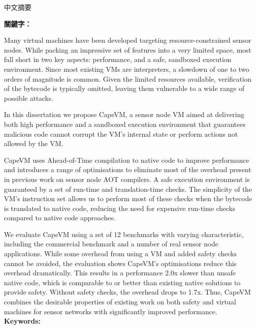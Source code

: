 \begin{abstractzh}
中文摘要

\bigbreak
\noindent \textbf{關鍵字：}{\, \makeatletter \@keywordszh \makeatother}
\end{abstractzh}

\begin{abstracten}
Many virtual machines have been developed targeting resource-constrained sensor nodes. While packing an impressive set of features into a very limited space, most fall short in two key aspects: performance, and a safe, sandboxed execution environment. Since most existing VMs are interpreters, a slowdown of one to two orders of magnitude is common. Given the limited resources available, verification of the bytecode is typically omitted, leaving them vulnerable to a wide range of possible attacks.

In this dissertation we propose CapeVM, a sensor node VM aimed at delivering both high performance and a sandboxed execution environment that guarantees malicious code cannot corrupt the VM's internal state or perform actions not allowed by the VM.

CapeVM uses Ahead-of-Time compilation to native code to improve performance and introduces a range of optimisations to eliminate most of the overhead present in previous work on sensor node AOT compilers. A safe execution environment is guaranteed by a set of run-time and translation-time checks. The simplicity of the VM's instruction set allows us to perform most of these checks when the bytecode is translated to native code, reducing the need for expensive run-time checks compared to native code approaches.

We evaluate CapeVM using a set of 12 benchmarks with varying characteristic, including the commercial  benchmark and a number of real sensor node applications. While some overhead from using a VM and added safety checks cannot be avoided, the evaluation shows CapeVM's optimisations reduce this overhead dramatically. This results in a performance 2.0x slower than unsafe native code, which is comparable to or better than existing native solutions to provide safety. Without safety checks, the overhead drops to 1.7x. Thus, CapeVM combines the desirable properties of existing work on both safety and virtual machines for sensor networks with significantly improved performance.
\bigbreak
\noindent \textbf{Keywords: }{\, \makeatletter \@keywordsen \makeatother}
\end{abstracten}

\begin{comment}


\end{comment}
